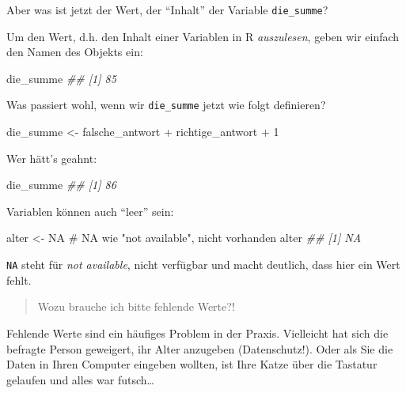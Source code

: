 \documentclass[
  letterpaper,
  oneside,
  open=any]{scrbook}
\newenvironment{Shaded}{\begin{snugshade}}{\end{snugshade}}
\newcommand{\CommentTok}[1]{\textcolor[rgb]{0.37,0.37,0.37}{#1}}
\newcommand{\ConstantTok}[1]{\textcolor[rgb]{0.56,0.35,0.01}{#1}}
\newcommand{\DecValTok}[1]{\textcolor[rgb]{0.68,0.00,0.00}{#1}}
\newcommand{\DocumentationTok}[1]{\textcolor[rgb]{0.37,0.37,0.37}{\textit{#1}}}
\newcommand{\NormalTok}[1]{\textcolor[rgb]{0.00,0.23,0.31}{#1}}
\newcommand{\OtherTok}[1]{\textcolor[rgb]{0.00,0.23,0.31}{#1}}
\newcommand{\SpecialCharTok}[1]{\textcolor[rgb]{0.37,0.37,0.37}{#1}}
\theoremstyle{definition}
\theoremstyle{definition}
\theoremstyle{definition}
\theoremstyle{remark}
\begin{document}
Aber was ist jetzt der Wert, der \enquote{Inhalt} der Variable
\texttt{die\_summe}?

Um den Wert, d.h. den Inhalt einer Variablen in R \emph{auszulesen},
geben wir einfach den Namen des Objekts ein:

\begin{Shaded}
\begin{Highlighting}[]
\NormalTok{die\_summe}
\DocumentationTok{\#\# [1] 85}
\end{Highlighting}
\end{Shaded}

Was passiert wohl, wenn wir \texttt{die\_summe} jetzt wie folgt
definieren?

\begin{Shaded}
\begin{Highlighting}[]
\NormalTok{die\_summe }\OtherTok{\textless{}{-}}\NormalTok{ falsche\_antwort }\SpecialCharTok{+}\NormalTok{ richtige\_antwort }\SpecialCharTok{+} \DecValTok{1}
\end{Highlighting}
\end{Shaded}

Wer hätt's geahnt:

\begin{Shaded}
\begin{Highlighting}[]
\NormalTok{die\_summe}
\DocumentationTok{\#\# [1] 86}
\end{Highlighting}
\end{Shaded}

Variablen können auch \enquote{leer} sein:

\begin{Shaded}
\begin{Highlighting}[]
\NormalTok{alter }\OtherTok{\textless{}{-}} \ConstantTok{NA}  \CommentTok{\# NA wie "not available", nicht vorhanden}
\NormalTok{alter}
\DocumentationTok{\#\# [1] NA}
\end{Highlighting}
\end{Shaded}

\texttt{NA} steht für \emph{not available}, nicht verfügbar und macht
deutlich, dass hier ein Wert fehlt.

\begin{quote}
{} Wozu brauche ich bitte fehlende Werte?!
\end{quote}

Fehlende Werte sind ein häufiges Problem in der Praxis. Vielleicht hat
sich die befragte Person geweigert, ihr Alter anzugeben (Datenschutz!).
Oder als Sie die Daten in Ihren Computer eingeben wollten, ist Ihre
Katze über die Tastatur gelaufen und alles war futsch\ldots{}
\end{document}
